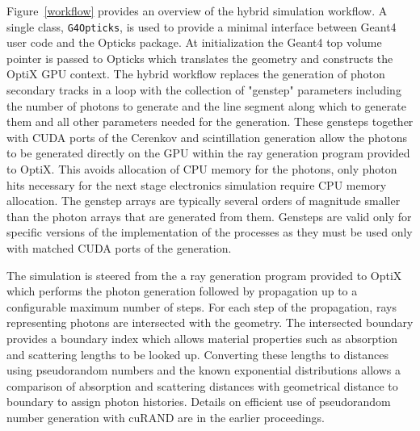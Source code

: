 \documentclass{webofc}
\begin{document}
Figure~\ref{workflow} provides an overview of the hybrid simulation workflow. 
A single class, {\tt G4Opticks}, is used to provide a 
minimal interface between Geant4 user code and 
the Opticks package. 
At initialization the Geant4 top volume pointer is
passed to Opticks which translates the geometry and constructs 
the OptiX GPU context.
%
The hybrid workflow replaces the generation of photon secondary tracks in a loop
with the collection of "genstep" parameters including the number of photons to generate
and the line segment along which to generate them and all other parameters needed for the generation.
These gensteps together with CUDA ports of the Cerenkov and scintillation generation  
allow the photons to be generated directly on the GPU within the ray generation program 
provided to OptiX.
%
This avoids allocation of CPU memory for the photons, only photon hits necessary for 
the next stage electronics simulation require CPU memory allocation.  
%
The genstep arrays are typically several orders of magnitude smaller than the photon arrays 
that are generated from them.  Gensteps are valid only for specific versions of the implementation
of the processes as they must be used only with matched CUDA ports of the generation.  

The simulation is steered from the a ray generation program provided to OptiX 
which performs the photon generation followed by propagation up to a configurable maximum 
number of steps. For each step of the propagation, rays representing photons are intersected
with the geometry. The intersected boundary provides a boundary index which allows 
material properties such as absorption and scattering lengths to be looked up. 
Converting these lengths to distances using pseudorandom numbers and 
the known exponential distributions allows a comparison of absorption and scattering distances 
with geometrical distance to boundary to assign photon histories. 
Details on efficient use of pseudorandom number generation with cuRAND\cite{curandURL} are in the 
earlier proceedings\cite{chep2016}.
%
%
%
%
\end{document}
